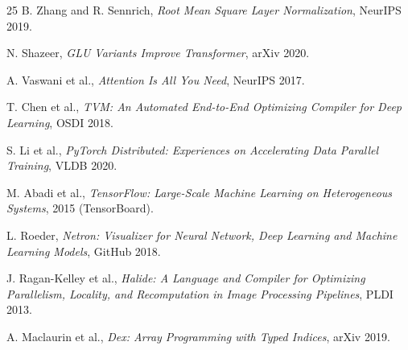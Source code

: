 \documentclass{article}
\begin{document}
\begin{thebibliography}{25}
B. Zhang and R. Sennrich, \textit{Root Mean Square Layer Normalization}, NeurIPS 2019.

N. Shazeer, \textit{GLU Variants Improve Transformer}, arXiv 2020.

A. Vaswani et al., \textit{Attention Is All You Need}, NeurIPS 2017.

T. Chen et al., \textit{TVM: An Automated End-to-End Optimizing Compiler for Deep Learning}, OSDI 2018.

S. Li et al., \textit{PyTorch Distributed: Experiences on Accelerating Data Parallel Training}, VLDB 2020.

M. Abadi et al., \textit{TensorFlow: Large-Scale Machine Learning on Heterogeneous Systems}, 2015 (TensorBoard).

L. Roeder, \textit{Netron: Visualizer for Neural Network, Deep Learning and Machine Learning Models}, GitHub 2018.

J. Ragan-Kelley et al., \textit{Halide: A Language and Compiler for Optimizing Parallelism, Locality, and Recomputation in Image Processing Pipelines}, PLDI 2013.

A. Maclaurin et al., \textit{Dex: Array Programming with Typed Indices}, arXiv 2019.

\end{thebibliography}
\end{document}
